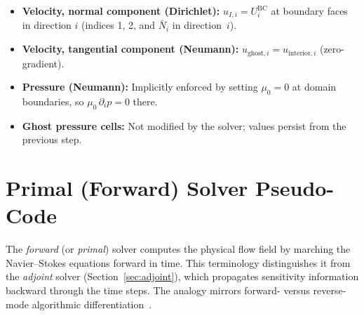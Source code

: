 \documentclass[11pt]{article}
\begin{document}
\begin{itemize}
  \item \textbf{Velocity, normal component (Dirichlet):}
    $u_{I,i} = U_i^{\mathrm{BC}}$ at boundary faces in direction $i$
    (indices 1, 2, and $\bar N_i$ in direction~$i$).
  \item \textbf{Velocity, tangential component (Neumann):}
    $u_{\text{ghost},i} = u_{\text{interior},i}$ (zero-gradient).
  \item \textbf{Pressure (Neumann):}
    Implicitly enforced by setting $\mu_0=0$ at domain boundaries,
    so $\mu_0\,\partial_i p = 0$ there.
  \item \textbf{Ghost pressure cells:}
    Not modified by the solver; values persist from the previous step.
\end{itemize}

\section{Primal (Forward) Solver Pseudo-Code}
\label{sec:forward}

The \emph{forward} (or \emph{primal}) solver computes the physical flow
field by marching the Navier--Stokes equations forward in time.  This
terminology distinguishes it from the \emph{adjoint} solver
(Section~\ref{sec:adjoint}), which propagates sensitivity information
backward through the time steps.  The analogy mirrors forward- versus
reverse-mode algorithmic differentiation~\cite{Martins2021}.
\end{document}
